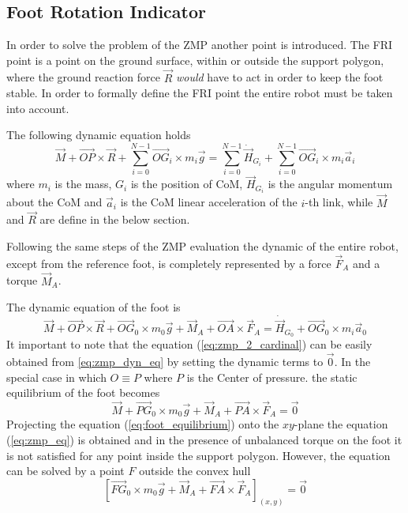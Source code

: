 \subsection{Foot Rotation Indicator}
In order to solve the problem of the ZMP another point is introduced. The FRI point is a point on
the ground surface, within or outside the support polygon, where the ground reaction force $\vec{R}$
\emph{would} have to act in order to keep the foot stable.
In order to formally define the FRI point the entire robot must be taken into
account.
\par
The following dynamic equation holds 
\[
\vec{M} + \vec{OP} \times \vec{R} + \sum_{i=0}^{N-1} {\vec{OG}_i \times m_i \vec{g}} = \sum_{i=0}^{N-1}
\dot{\vec{H}}_{G_i} + \sum_{i=0}^{N-1} {\vec{OG}_i \times m_i \vec{a}_i}
\]
where $m_i$ is the mass, $G_i$ is the position of CoM, $\vec{H}_{G_i}$ is the angular momentum about the CoM and $\vec{a}_i$ is the CoM linear acceleration of the $i$-th link, while $\vec{M}$ and
$\vec{R}$ are define in the below section.
\par
Following the same steps of the ZMP evaluation the dynamic of the entire robot, except from
the reference foot, is completely represented by a force $\vec{F}_A$ and a torque $\vec{M}_A$.
\par
The dynamic equation of the foot is
\begin{equation}
  \label{eq:zmp_dyn_eq}
  \vec{M} + \vec{OP} \times \vec{R} + \vec{OG}_0 \times m_0 \vec{g} + \vec{M}_A + \vec{OA} \times \vec{F}_A  = \dot{\vec{H}}_{G_0} + \vec{OG}_0 \times m_i \vec{a}_0
\end{equation}
It important to note that the equation (\ref{eq:zmp_2_cardinal}) can be easily obtained from
\ref{eq:zmp_dyn_eq} by setting the dynamic terms to $\vec{0}$.
In the special case in which $O \equiv P$ where $P$ is the Center of pressure. the static
equilibrium of the foot becomes
\begin{equation}
  \label{eq:foot_equilibrium}
  \vec{M} + \vec{PG}_0 \times m_0 \vec{g} + \vec{M}_A + \vec{PA} \times \vec{F}_A = \vec{0}
\end{equation}
Projecting the equation (\ref{eq:foot_equilibrium}) onto the $xy$-plane the equation
(\ref{eq:zmp_eq}) is obtained and in the presence of unbalanced torque on the foot it
is not satisfied for any point inside the support polygon. However, the equation
can be solved by a point $F$ outside the convex hull
\begin{equation}
  \label{eq:fri_eq}
  \left [\vec{FG}_0 \times m_0 \vec{g} + \vec{M}_A + \vec{FA} \times \vec{F}_A \right]_{(x,y)} = \vec{0}
\end{equation}
